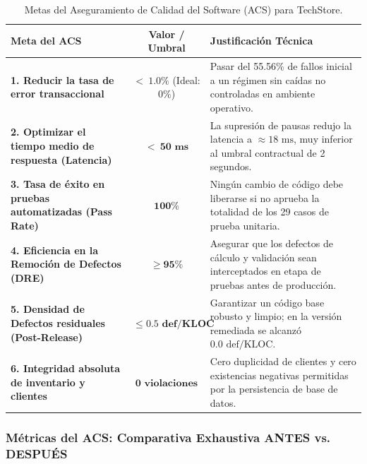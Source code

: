 \documentclass{article}
\begin{document}
\begin{table}[H]
\centering
\caption{Metas del Aseguramiento de Calidad del Software (ACS) para TechStore.}
\label{tab:metas_acs}
\renewcommand{\arraystretch}{1.3}
\begin{tabular}{p{7.5cm}cp{5.5cm}}
\toprule
\textbf{Meta del ACS} & \textbf{Valor / Umbral} & \textbf{Justificación Técnica} \\
\midrule
\textbf{1. Reducir la tasa de error transaccional} & $\mathbf{<\ 1.0\%}$ (Ideal: $0\%$) & Pasar del 55.56\% de fallos inicial a un régimen sin caídas no controladas en ambiente operativo. \\
\textbf{2. Optimizar el tiempo medio de respuesta (Latencia)} & $\mathbf{<\ 50\text{ ms}}$ & La supresión de pausas redujo la latencia a $\approx 18\text{ ms}$, muy inferior al umbral contractual de 2 segundos. \\
\textbf{3. Tasa de éxito en pruebas automatizadas (Pass Rate)} & $\mathbf{100\%}$ & Ningún cambio de código debe liberarse si no aprueba la totalidad de los 29 casos de prueba unitaria. \\
\textbf{4. Eficiencia en la Remoción de Defectos (DRE)} & $\mathbf{\ge 95\%}$ & Asegurar que los defectos de cálculo y validación sean interceptados en etapa de pruebas antes de producción. \\
\textbf{5. Densidad de Defectos residuales (Post-Release)} & $\mathbf{\le 0.5\text{ def/KLOC}}$ & Garantizar un código base robusto y limpio; en la versión remediada se alcanzó $0.0\text{ def/KLOC}$. \\
\textbf{6. Integridad absoluta de inventario y clientes} & $\mathbf{0\text{ violaciones}}$ & Cero duplicidad de clientes y cero existencias negativas permitidas por la persistencia de base de datos. \\
\bottomrule
\end{tabular}
\end{table}

\subsubsection{Métricas del ACS: Comparativa Exhaustiva ANTES vs. DESPUÉS}
\end{document}
